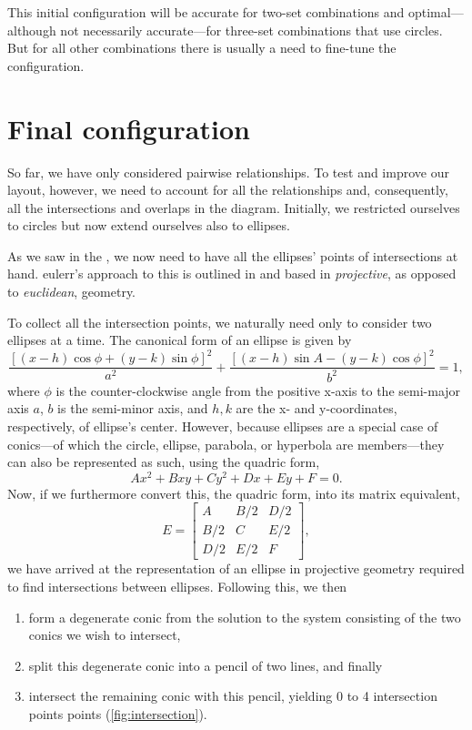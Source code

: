 \documentclass[
  oneside,
  usegeometry,
  numbers=noendperiod,
  openany,
  parskip=half
]{scrbook}\usepackage[]{graphicx}\usepackage{xcolor}
\newcommand{\pkg}[1]{{\fontseries{b}\selectfont #1}}
\begin{document}
This initial configuration will be accurate for two-set combinations and optimal---although not necessarily accurate---for three-set combinations that use circles. But for all other combinations there is usually a need to fine-tune the configuration.

\section{Final configuration}
\label{sec:finalConfig}

So far, we have only considered pairwise relationships. To test and improve our layout, however, we need to account for all the relationships and, consequently, all the intersections and overlaps in the diagram. Initially, we restricted ourselves to circles but now extend ourselves also to ellipses.

As we saw in the , we now need to have all the ellipses' points of intersections at hand. \pkg{eulerr}'s approach to this is outlined in \citet{richter-gebert_2011} and based in \emph{projective}, as opposed to \emph{euclidean}, geometry.

To collect all the intersection points, we naturally need only to consider two ellipses at a time. The canonical form of an ellipse is given by
\[
\frac{\left[ (x-h)\cos{\phi}+(y-k)\sin{\phi} \right]^2}{a^2}+\frac{\left[(x-h) \sin{A}-(y-k)
  \cos{\phi}\right]^2}{b^2} = 1,
\]
where $\phi$ is the counter-clockwise angle from the positive x-axis to the semi-major axis $a$, $b$ is the semi-minor axis, and $h, k$ are the x- and y-coordinates, respectively, of ellipse's center. However, because ellipses are a special case of conics---of which the circle, ellipse, parabola, or hyperbola are members---they can also be represented as such, using the quadric form,
\[
Ax^2 + Bxy + Cy^2 + Dx + Ey + F = 0.
\]
Now, if we furthermore convert this, the quadric form, into its matrix equivalent,
\[
E = \begin{bmatrix}
      A   & B/2 & D/2 \\
      B/2 & C   & E/2 \\
      D/2 & E/2 & F
    \end{bmatrix},
\]
we have arrived at the representation of an ellipse in projective geometry required to find intersections between ellipses. Following this, we then
\begin{enumerate}
\item form a degenerate conic from the solution to the system consisting of the two conics we wish to intersect,
\item split this degenerate conic into a pencil of two lines, and finally
\item intersect the remaining conic with this pencil, yielding 0 to 4 intersection points points (\cref{fig:intersection}).
\end{enumerate}
\end{document}
